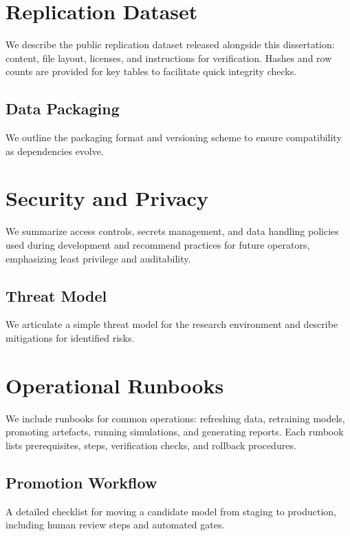\documentclass[12pt]{report}  %
\numberwithin{equation}{section}
\theoremstyle{plain}
\theoremstyle{definition}
\theoremstyle{remark}
\begin{document}
\chapter{Replication Dataset}
We describe the public replication dataset released alongside this dissertation: content, file layout, licenses, and instructions for verification. Hashes and row counts are provided for key tables to facilitate quick integrity checks.

\section{Data Packaging}
We outline the packaging format and versioning scheme to ensure compatibility as dependencies evolve.

\chapter{Security and Privacy}
We summarize access controls, secrets management, and data handling policies used during development and recommend practices for future operators, emphasizing least privilege and auditability.

\section{Threat Model}
We articulate a simple threat model for the research environment and describe mitigations for identified risks.

\chapter{Operational Runbooks}
We include runbooks for common operations: refreshing data, retraining models, promoting artefacts, running simulations, and generating reports. Each runbook lists prerequisites, steps, verification checks, and rollback procedures.

\section{Promotion Workflow}
A detailed checklist for moving a candidate model from staging to production, including human review steps and automated gates.
\end{document}
